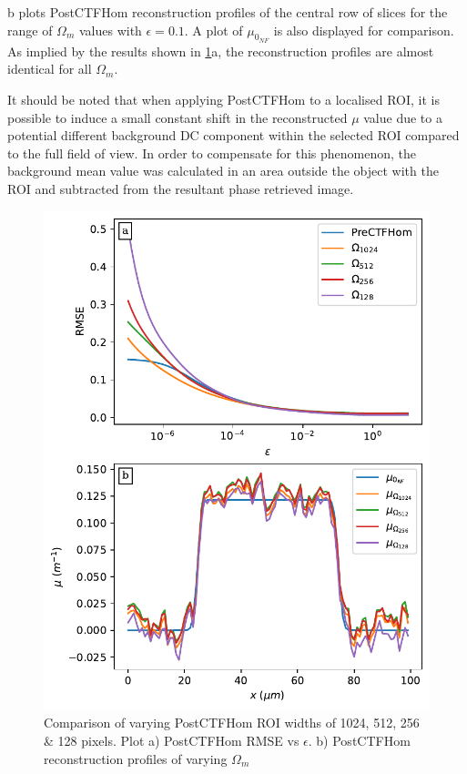 \documentclass[twocolumn, switch]{article} %
\begin{document}
b plots PostCTFHom reconstruction profiles of the central row of slices for the range of ${\Omega _m}$ values with $\epsilon=0.1$. A plot of $\mu_{0_{NF}}$ is also displayed for comparison. As implied by the results shown in \cref{fig:PostCTFHom_roi}a, the reconstruction profiles are almost identical for all ${\Omega _m}$.

It should be noted that when applying PostCTFHom to a localised ROI, it is possible to induce a small constant shift in the reconstructed $\mu$ value due to a potential different background DC component within the selected ROI compared to the full field of view. In order to compensate for this phenomenon, the background mean value was calculated in an area outside the object with the ROI and subtracted from the resultant phase retrieved image.

\begin{figure}[!htbp]
    \centering
        \includegraphics[width=\linewidth]{ctf_paper_results_figure_5.pdf}
        \caption{Comparison of varying PostCTFHom ROI widths of 1024, 512, 256 \& 128 pixels. Plot a) PostCTFHom RMSE vs $\epsilon$. b) PostCTFHom reconstruction profiles of varying ${\Omega _m}$}
        \label{fig:PostCTFHom_roi}
\end{figure}
\end{document}
